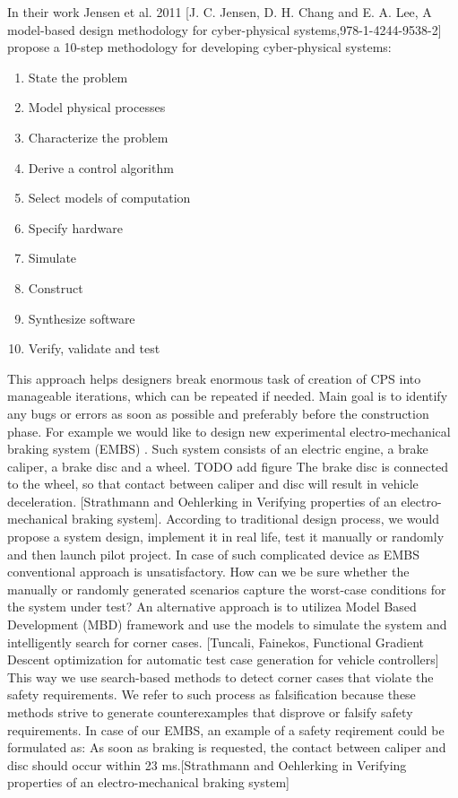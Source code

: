 In their work Jensen et al. 2011  [J. C. Jensen, D. H. Chang and E. A. Lee, A model-based design methodology for cyber-physical systems,978-1-4244-9538-2] propose a 10-step methodology for developing cyber-physical systems:

\begin{enumerate}
	\item State the problem
	\item Model physical processes
	\item Characterize the problem
	\item Derive a control algorithm
	\item Select models of computation
	\item Specify hardware
	\item Simulate
	\item Construct
	\item Synthesize software
	\item Verify, validate and test
\end{enumerate}

This approach helps designers break enormous task of creation of CPS into manageable iterations, which can be repeated if needed. Main goal is to identify any bugs or errors as soon as possible and preferably before the construction phase. For example we would like to design new experimental electro-mechanical braking system (EMBS) . Such system consists of an electric engine, a brake caliper, a brake disc and a wheel. TODO add figure The brake disc is connected to the wheel, so that contact between caliper and disc will result in vehicle deceleration. [Strathmann and Oehlerking in Verifying properties of an electro-mechanical braking system]. According to traditional design process, we would propose a system design, implement it in real life, test it manually or randomly and then launch pilot project. In case of such complicated device as EMBS conventional approach is unsatisfactory. How can we be sure whether the manually or randomly generated scenarios capture the worst-case conditions for the system under test? An alternative approach is to utilizea Model Based Development (MBD) framework and use the models to simulate the system and intelligently search for corner cases. [Tuncali, Fainekos, Functional Gradient Descent optimization for automatic test case generation for vehicle controllers] This way we use search-based methods to detect corner cases that violate the safety requirements. We refer to such process as falsification because these methods strive to generate counterexamples that disprove or falsify safety requirements. In case of our EMBS, an example of a safety reqirement could be formulated as: As soon as braking is requested, the contact between caliper and disc should occur within 23 ms.[Strathmann and Oehlerking in Verifying properties of an electro-mechanical braking system]

